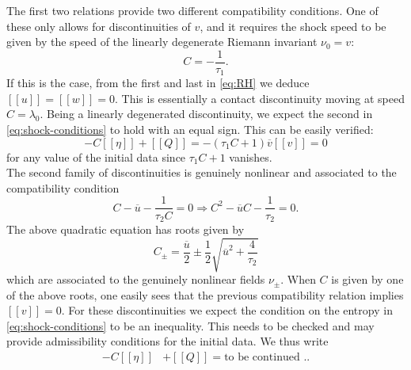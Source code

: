 \documentclass{article}
\theoremstyle{plain}
\theoremstyle{definition}
\numberwithin{theorem}{section}
\newcommand{\todo}[1]{{\Large{\color{red}{#1}}}}
\begin{document}
The first two  relations provide two different compatibility conditions. 
One of these only allows for  discontinuities of $v$, and  it requires  the shock speed to be given by the speed of the linearly degenerate Riemann invariant $\nu_0=v$:
\begin{equation}
  C = - \dfrac{1}{\tau_1}.  
\end{equation}
 If this is the case,   from the first and last in \eqref{eq:RH}   we deduce $[\![ u]\!] =[\![ w]\!] =0 $. This is essentially a contact discontinuity  moving at speed $C=\lambda_0$.
 Being a linearly degenerated discontinuity, we expect the second in \eqref{eq:shock-conditions} to hold with an equal sign. This can be easily verified: 
\begin{equation}
-C [\![\eta ]\!]  +  [\![ Q ]\!] =  - (\tau_1 C + 1) {\overline  v }  [\![ v ]\!] = 0
\end{equation}
for any value of the initial data since $\tau_1 C + 1$ vanishes. \\

The second family of discontinuities is genuinely nonlinear and associated to the compatibility condition 
\begin{equation}
C- { \overline u} -\dfrac{1}{\tau_2 C} =0 \Rightarrow   C^2 - { \overline u} C  -\dfrac{1}{\tau_2 } =0.
\end{equation}
The above quadratic equation has    roots given by 
\begin{equation}
C_{\pm} = \dfrac{\overline u}{2} \pm \dfrac{1}{2} \sqrt{{\overline u}^2 +\dfrac{4}{\tau_2} }
\end{equation}
which are associated to the genuinely nonlinear fields $\nu_{\pm}$. When $C$ is given by one of the above roots, one easily sees that the previous compatibility relation implies $ [\![ v ]\!]=0$.  For these discontinuities we expect the condition on the entropy in \eqref{eq:shock-conditions} to be an inequality. This needs to be checked and may provide
admissibility conditions for the initial data. We thus write
\begin{equation}
\begin{aligned}
-C [\![\eta ]\!]  & +  [\![ Q ]\!] =  \text{to be continued ..}
\end{aligned}
\end{equation}







\todo{TODO: Check well-posedness results for KdV}
\end{document}
